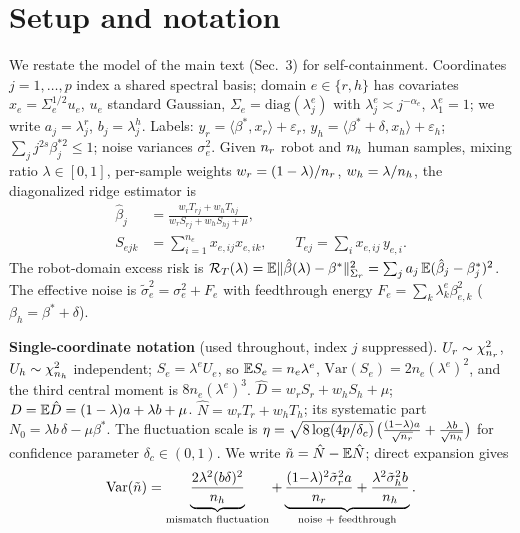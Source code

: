 
\section{Setup and notation}
\label{supp:setup}

We restate the model of the main text (Sec.~3) for self-containment.
Coordinates $j = 1,\dots,p$ index a shared spectral basis; domain $e \in \{r, h\}$ has covariates $x_e = \Sigma_e^{1/2} u_e$, $u_e$ standard Gaussian, $\Sigma_e = \mathrm{diag}(\lambda^e_j)$ with $\lambda^e_j \asymp j^{-\alpha_e}$, $\lambda^e_1 = 1$; we write $a_j = \lambda^r_j$, $b_j = \lambda^h_j$.
Labels: $y_r = \langle\beta^*, x_r\rangle + \varepsilon_r$, $y_h = \langle\beta^* + \delta, x_h\rangle + \varepsilon_h$; $\sum_j j^{2s}\beta_j^{*2} \le 1$; noise variances $\sigma_e^2$.
Given $n_r$ robot and $n_h$ human samples, mixing ratio $\lambda \in [0,1]$, per-sample weights $w_r = (1-\lambda)/n_r$, $w_h = \lambda/n_h$, the diagonalized ridge estimator is
\begin{equation}
\begin{aligned}
  \hat\beta_j &= \frac{w_r T_{rj} + w_h T_{hj}}{w_r S_{rj} + w_h S_{hj} + \mu},\\
  S_{ejk} &= {\textstyle\sum_{i=1}^{n_e}} x_{e,ij} x_{e,ik},\qquad
  T_{ej} = {\textstyle\sum_i} x_{e,ij}\, y_{e,i}.
\end{aligned}
  \label{supp:eq:estimator}
\end{equation}
The robot-domain excess risk is $\mathcal{R}_T(\lambda) = \mathbb{E}\|\hat\beta(\lambda) - \beta^*\|^2_{\Sigma_r} = \sum_j a_j\, \mathbb{E}(\hat\beta_j - \beta^*_j)^2$.
The effective noise is $\tilde\sigma_e^2 = \sigma_e^2 + F_e$ with feedthrough energy $F_e = \sum_k \lambda^e_k \beta_{e,k}^2$ ($\beta_h = \beta^* + \delta$).

\medskip
\noindent\textbf{Single-coordinate notation} (used throughout, index $j$ suppressed).
$U_r \sim \chi^2_{n_r}$, $U_h \sim \chi^2_{n_h}$ independent; $S_e = \lambda^e U_e$, so $\mathbb{E} S_e = n_e\lambda^e$, $\mathrm{Var}(S_e) = 2n_e(\lambda^e)^2$, and the third central moment is $8n_e(\lambda^e)^3$.
$\hat D = w_r S_r + w_h S_h + \mu$; $D = \mathbb{E}\hat D = (1-\lambda)a + \lambda b + \mu$.
$\hat N = w_r T_{r} + w_h T_{h}$; its systematic part $N_0 = \lambda b\,\delta - \mu\beta^*$.
The fluctuation scale is $\eta = \sqrt{8\log(4p/\delta_c)}\,\big(\frac{(1-\lambda)a}{\sqrt{n_r}} + \frac{\lambda b}{\sqrt{n_h}}\big)$ for confidence parameter $\delta_c \in (0,1)$.
We write $\tilde n = \hat N - \mathbb{E}\hat N$; direct expansion gives
\begin{equation}
  \mathrm{Var}(\tilde n) = \underbrace{\frac{2\lambda^2 (b\delta)^2}{n_h}}_{\text{mismatch fluctuation}} + \underbrace{\frac{(1{-}\lambda)^2 \tilde\sigma_r^2 a}{n_r} + \frac{\lambda^2 \tilde\sigma_h^2 b}{n_h}}_{\text{noise + feedthrough}} .
  \label{supp:eq:varn}
\end{equation}

